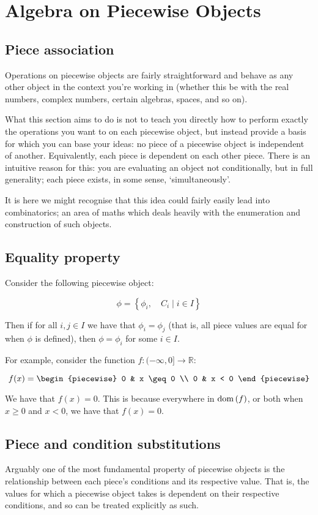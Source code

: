 \section{Algebra on Piecewise Objects}
\subsection{Piece association}
Operations on piecewise objects are fairly straightforward and behave as any other object in the context you're working in (whether this be with the real numbers, complex numbers, certain algebras, spaces, and so on). 

What this section aims to do is not to teach you directly how to perform exactly the operations you want to on each piecewise object, but instead provide a basis for which you can base your ideas: no piece of a piecewise object is independent of another. Equivalently, each piece is dependent on each other piece. There is an intuitive reason for this: you are evaluating an object not conditionally, but in full generality; each piece exists, in some sense, `simultaneously'.

It is here we might recognise that this idea could fairly easily lead into combinatorics; an area of maths which deals heavily with the enumeration and construction of such objects.
\subsection{Equality property}
\begin{theorem}
    Consider the following piecewise object:

    $$
        \phi=\left\{\phi_i,\quad C_i\mid i\in I\right\}    
    $$

    Then if for all $i,j\in I$ we have that $\phi_i=\phi_j$ (that is, all piece values are equal for when $\phi$ is defined), then $\phi=\phi_i$ for some $i\in I$.

    For example, consider the function $f:(-\infty,0]\to\mathbb{R}$:

    $$
        f(x) = \begin{piecewise}
            0 & x \geq 0 \\
            0 & x < 0
        \end{piecewise}
    $$

    We have that $f(x)=0$. This is because everywhere in $\operatorname{dom}\left(f\right)$, or both when $x\geq 0$ and $x < 0$, we have that $f(x)=0$.
\end{theorem}
\subsection{Piece and condition substitutions}
Arguably one of the most fundamental property of piecewise objects is the relationship between each piece's conditions and its respective value. That is, the values for which a piecewise object takes is dependent on their respective conditions, and so can be treated explicitly as such.

